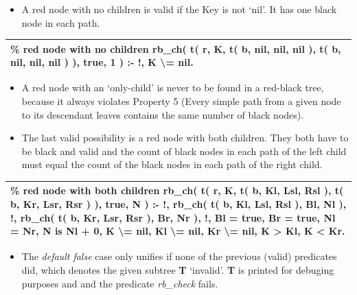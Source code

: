 \documentclass{article}
\newenvironment{code}{\obeycr\begin{it}\nopagebreak\addvspace{1ex}\noindent\footnotesize\begin{tabular}{|p{0.95\textwidth}|}\hline}{\\\hline\end{tabular}\par\addvspace{1ex}\end{it}\restorecr}
\newcommand{\inlinecode}[1]{\textit{#1}}
\begin{document}
\begin{itemize}
\item
A red node with no children is valid if the Key is not `nil'. It has one black node in each path.
\end{itemize}

\begin{code}
\% red node with no children
rb\_ch( t( r, K, t( b, nil, nil, nil ), t( b, nil, nil, nil ) ), true, 1 ) :- !, 
\hspace{2ex}K \textbackslash{}= nil.
\end{code}

\begin{itemize}
\item
A red node with an `only-child' is never to be found in a red-black tree, because it always violates Property 5 (Every simple path from a given node to its descendant leaves contains the same number of black nodes). 
\item
The last valid possibility is a red node with both children. They both have to be black and valid and the count of black nodes in each path of the left child must equal the count of the black nodes in each path of the right child.
\end{itemize}

\begin{code}
\% red node with both children
rb\_ch( t( r, K, t( b, Kl, Lsl, Rsl ), t( b, Kr, Lsr, Rsr ) ), true, N ) :- !, 
\hspace{2ex}rb\_ch( t( b, Kl, Lsl, Rsl ), Bl, Nl ), !, 
\hspace{2ex}rb\_ch( t( b, Kr, Lsr, Rsr ), Br, Nr ), !, 
\hspace{2ex}Bl = true, 
\hspace{2ex}Br = true,
\hspace{2ex}Nl = Nr,
\hspace{2ex}N is Nl + 0,
\hspace{2ex}K \textbackslash{}= nil,
\hspace{2ex}Kl \textbackslash{}= nil,
\hspace{2ex}Kr \textbackslash{}= nil,
\hspace{2ex}K \textgreater{} Kl, 
\hspace{2ex}K \textless{} Kr.
\end{code}

\begin{itemize}
\item
The \inlinecode{default false} case only unifies if none of the  previous (valid) predicates did, which denotes the given subtree \textbf{T} `invalid'. \textbf{T} is printed for debuging purposes and and the predicate \inlinecode{rb\_check} fails.
\end{itemize}
\end{document}
